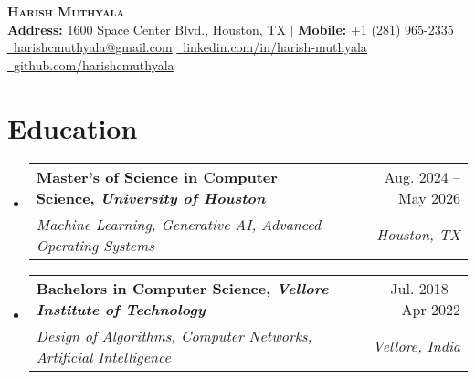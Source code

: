 \documentclass[letterpaper,11pt]{article}
\makeatletter
\newcommand{\resumeSubheading}[4]{
  \vspace{-2pt}\item
    \begin{tabular*}{0.97\textwidth}[t]{l@{\extracolsep{\fill}}r}
      \textbf{#1} & #2 \\
      \textit{\small#3} & \textit{\small #4} \\
    \end{tabular*}\vspace{-7pt}
}
\newcommand{\resumeSubHeadingListStart}{\begin{itemize}[leftmargin=0.15in, label={}]}
\newcommand{\resumeSubHeadingListEnd}{\end{itemize}}
\makeatother
\begin{document}

\begin{center}
    \textbf{\Huge \scshape Harish Muthyala} \\
    {\small
        \vspace{6pt}
        \textbf{Address:} 1600 Space Center Blvd., Houston, TX $|$ \textbf{Mobile:} +1 (281) 965-2335 \\
        \vspace{3pt}
        \href{mailto:harishcmuthyala@gmail.com}{\faEnvelope~\underline{harishcmuthyala@gmail.com}} \hspace{1em}
        \href{https://linkedin.com/in/harish-muthyala}{\faLinkedinSquare~\underline{linkedin.com/in/harish-muthyala}} \hspace{1em}
        \href{https://github.com/harishcmuthyala}{\faGithub~\underline{github.com/harishcmuthyala}}
    }
\end{center}





\section{Education}
\resumeSubHeadingListStart
  \resumeSubheading
    {Master's of Science in Computer Science, \textmd{\textit{University of Houston}}}{Aug. 2024 -- May 2026}
    {Machine Learning, Generative AI, Advanced Operating Systems}{Houston, TX}

  \resumeSubheading
    {Bachelors in Computer Science, \textmd{\textit{Vellore Institute of Technology}}}{Jul. 2018 -- Apr 2022}
    {Design of Algorithms, Computer Networks, Artificial Intelligence}{Vellore, India}
\resumeSubHeadingListEnd


%
\end{document}
